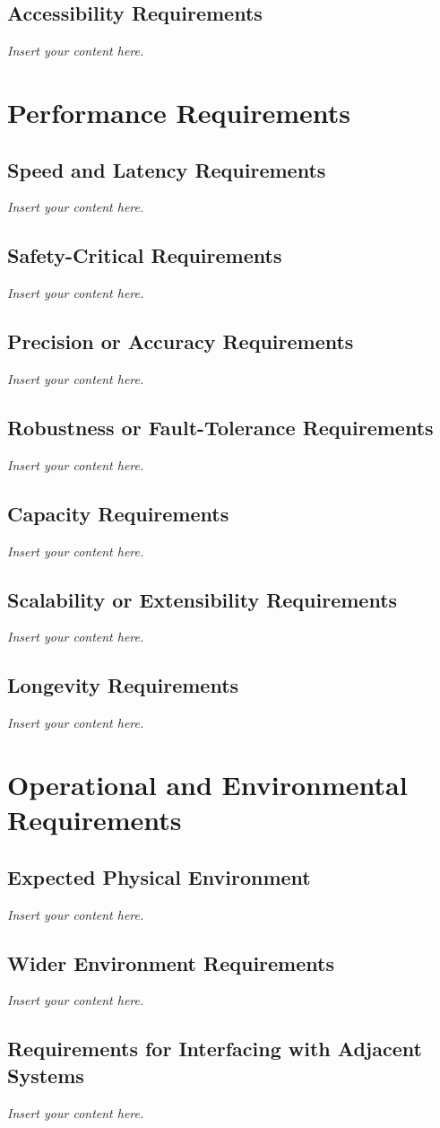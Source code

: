 \documentclass[12pt]{article}
\newcommand{\lips}{\textit{Insert your content here.}}
\begin{document}
\subsection{Accessibility Requirements}
\lips

\section{Performance Requirements}
\subsection{Speed and Latency Requirements}
\lips
\subsection{Safety-Critical Requirements}
\lips
\subsection{Precision or Accuracy Requirements}
\lips
\subsection{Robustness or Fault-Tolerance Requirements}
\lips
\subsection{Capacity Requirements}
\lips
\subsection{Scalability or Extensibility Requirements}
\lips
\subsection{Longevity Requirements}
\lips

\section{Operational and Environmental Requirements}
\subsection{Expected Physical Environment}
\lips
\subsection{Wider Environment Requirements}
\lips
\subsection{Requirements for Interfacing with Adjacent Systems}
\lips
\end{document}
